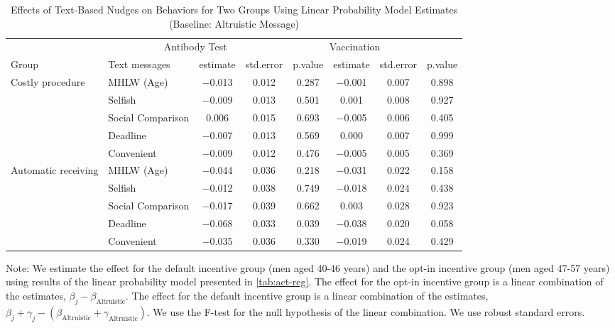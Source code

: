 \begin{table}

\caption{Effects of Text-Based Nudges on Behaviors for Two Groups Using Linear Probability Model Estimates (Baseline: Altruistic Message) \label{tab:act-reg-ftest2}}
\centering
\fontsize{9}{11}\selectfont
\begin{threeparttable}
\begin{tabular}[t]{>{\raggedright\arraybackslash}p{5em}lcccccc}
\toprule
\multicolumn{2}{c}{ } & \multicolumn{3}{c}{Antibody Test} & \multicolumn{3}{c}{Vaccination} \\
\cmidrule(l{3pt}r{3pt}){3-5} \cmidrule(l{3pt}r{3pt}){6-8}
Group & Text messages & estimate & std.error & p.value & estimate  & std.error  & p.value \\
\midrule
Costly procedure & MHLW (Age) & \num{-0.013} & \num{0.012} & \num{0.287} & \num{-0.001} & \num{0.007} & \num{0.898}\\
 & Selfish & \num{-0.009} & \num{0.013} & \num{0.501} & \num{0.001} & \num{0.008} & \num{0.927}\\
 & Social Comparison & \num{0.006} & \num{0.015} & \num{0.693} & \num{-0.005} & \num{0.006} & \num{0.405}\\
 & Deadline & \num{-0.007} & \num{0.013} & \num{0.569} & \num{0.000} & \num{0.007} & \num{0.999}\\
 & Convenient & \num{-0.009} & \num{0.012} & \num{0.476} & \num{-0.005} & \num{0.005} & \num{0.369}\\
Automatic receiving & MHLW (Age) & \num{-0.044} & \num{0.036} & \num{0.218} & \num{-0.031} & \num{0.022} & \num{0.158}\\
 & Selfish & \num{-0.012} & \num{0.038} & \num{0.749} & \num{-0.018} & \num{0.024} & \num{0.438}\\
 & Social Comparison & \num{-0.017} & \num{0.039} & \num{0.662} & \num{0.003} & \num{0.028} & \num{0.923}\\
 & Deadline & \num{-0.068} & \num{0.033} & \num{0.039} & \num{-0.038} & \num{0.020} & \num{0.058}\\
 & Convenient & \num{-0.035} & \num{0.036} & \num{0.330} & \num{-0.019} & \num{0.024} & \num{0.429}\\
\bottomrule
\end{tabular}
\begin{tablenotes}
\item Note: We estimate the effect for the default incentive group (men aged 40-46 years) and the opt-in incentive group (men aged 47-57 years) using results of the linear probability model presented in \ref{tab:act-reg}. The effect for the opt-in incentive group is a linear combination of the estimates, $\beta_j - \beta_{\text{Altruistic}}$. The effect for the default incentive group is a linear combination of the estimates, $\beta_j + \gamma_j - (\beta_{\text{Altruistic}} + \gamma_{\text{Altruistic}})$. We use the F-test for the null hypothesis of the linear combination. We use robust standard errors.
\end{tablenotes}
\end{threeparttable}
\end{table}
